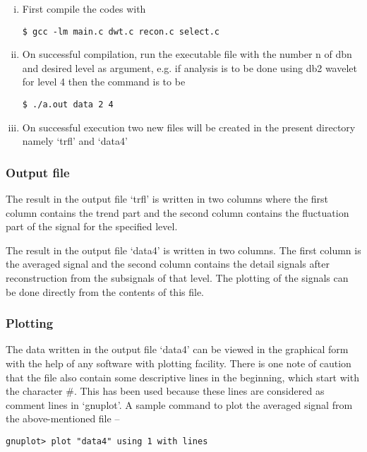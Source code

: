 \documentclass[a4paper,11pt]{report}
\begin{document}
\begin{enumerate}[(i)]
\item First compile the codes with
\begin{verbatim}
$ gcc -lm main.c dwt.c recon.c select.c
\end{verbatim}

\item On successful compilation, run the executable file with the number n of dbn and desired level as argument, e.g. if analysis is to be done using db2 wavelet for level 4 then the command is to be 

\begin{verbatim}
$ ./a.out data 2 4
\end{verbatim}

\item On successful execution two new files will be created in the present directory namely `trfl' and `data4'
\end{enumerate}

\subsubsection{Output file}

The result in the output file `trfl' is written in two columns where the first column contains the trend part and the second column contains the fluctuation part of the signal for the specified level.

The result in the output file `data4' is written in two columns. The first column is the averaged signal and the second column contains the detail signals after reconstruction from the subsignals of that level. The plotting of the signals can be done directly from the contents of this file.

\subsubsection{Plotting}

The data written in the output file `data4' can be viewed in the graphical form with the help of any software with plotting facility. There is one note of caution that the file also contain some descriptive lines in the beginning, which start with the character \#. This has been used because these lines are considered as comment lines in `gnuplot'. A sample command to plot the averaged signal from the above-mentioned file --

\begin{verbatim}
gnuplot> plot "data4" using 1 with lines
\end{verbatim}

\clearpage





\end{document}
